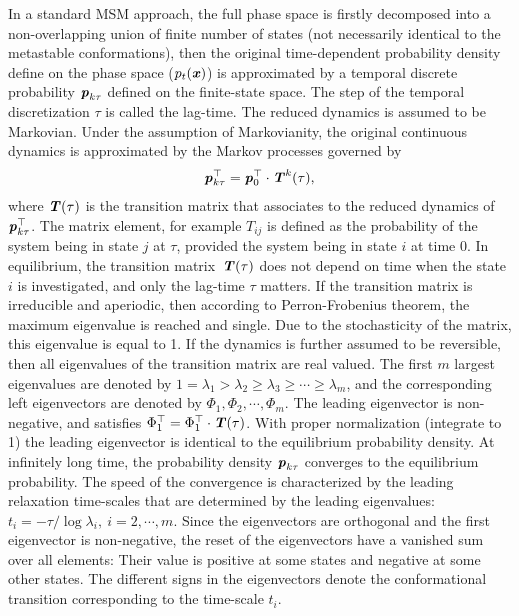 \documentclass[epjST]{svjour}
\newcommand{\vect}[1]{\textbf{\textit{#1}}}
\begin{document}
In a standard MSM approach, the full phase space is firstly decomposed into a non-overlapping union of finite number of states
(not necessarily identical to the metastable conformations),
then
the original time-dependent probability density define on the phase
space ($p_t(\vect x)$) is approximated by a temporal discrete probability $\vect p_{k\tau}$ defined on the finite-state space.
The step of the temporal discretization $\tau$ is called the lag-time.
The reduced
dynamics is assumed to be Markovian.
Under the assumption of Markovianity, the original continuous dynamics is approximated by the Markov processes governed by
\begin{align}
\vect p^\top_{k\tau} = \vect p^\top_0 \cdot \vect T^k(\tau),
\end{align}
where $\vect T(\tau)$ is the transition matrix that
associates to the reduced dynamics of $\vect p^\top_{k\tau}$. The matrix element, for example $T_{ij}$
is defined as the probability of the system being in state
$j$ at $\tau$,  provided the system being in state $i$ at time 0.
In equilibrium, the transition matrix~$\vect T(\tau)$ does not depend on time when the state $i$ is investigated, and only the
lag-time $\tau$ matters.
If the transition matrix is irreducible and aperiodic, then according to Perron-Frobenius theorem, the maximum
eigenvalue is reached and single. Due to the stochasticity of the matrix, this eigenvalue is equal to 1.
If the dynamics
is further assumed to be reversible, then all eigenvalues of the transition matrix are
real valued.
The first $m$ largest eigenvalues are denoted by $1 = \lambda_1 > \lambda_2 \geq \lambda_3 \geq \cdots \geq \lambda_m$, and
the corresponding left eigenvectors are denoted by $\Phi_1, \Phi_2, \cdots, \Phi_m$.
The leading eigenvector is non-negative, and satisfies $\Phi^\top_1 = \Phi^\top_1\cdot\vect T(\tau)$.
With proper normalization (integrate to 1) the leading eigenvector is identical to the 
equilibrium probability density.
At infinitely long time, the probability density $\vect p_{k\tau}$ converges to the equilibrium probability.
The speed of the convergence is characterized by the leading relaxation time-scales that are
determined by the leading eigenvalues:  $t_i  = -{\tau}/{\log\lambda_i}, \ i=2, \cdots, m$.
Since the eigenvectors are orthogonal and the first eigenvector is non-negative, the reset
of the eigenvectors have a vanished sum over all elements: Their
value is positive at some states and negative at some other states.
The different signs in the eigenvectors denote the conformational transition corresponding to the
time-scale $t_i$.
\end{document}
